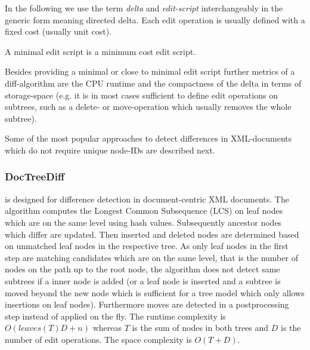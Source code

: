 In the following we use the term \emph{delta} and \emph{edit-script} interchangeably in the generic form meaning directed delta. Each edit operation is usually defined with a fixed cost (usually unit cost).

\begin{mydef}
A minimal edit script is a minimum cost edit script.
\end{mydef}

Besides providing a minimal or close to minimal edit script further metrics of a diff-algorithm are the CPU runtime and the compactness of the delta in terms of storage-space (e.g. it is in most cases sufficient to define edit operations on subtrees, such as a delete- or move-operation which usually removes the whole subtree).

Some of the most popular approaches to detect differences in XML-documents which do not require unique node-IDs are described next.

\subsubsection{DocTreeDiff\cite{ronnau2009efficient}}
is designed for difference detection in document-centric XML documents. The algorithm computes the Longest Common Subsequence (LCS) on leaf nodes which are on the same level using hash values. Subsequently ancestor nodes which differ are updated. Then inserted and deleted nodes are determined based on unmatched leaf nodes in the respective tree. As only leaf nodes in the first step are matching candidates which are on the same level, that is the number of nodes on the path up to the root node, the algorithm does not detect same subtrees if a inner node is added (or a leaf node is inserted and a subtree is moved beyond the new node which is sufficient for a tree model which only allows insertions on leaf nodes). Furthermore moves are detected in a postprocessing step instead of applied on the fly. The runtime complexity is $O(leaves(T)D + n)$ whereas $T$ is the sum of nodes in both trees and $D$ is the number of edit operations. The space complexity is $O(T+D)$.%


